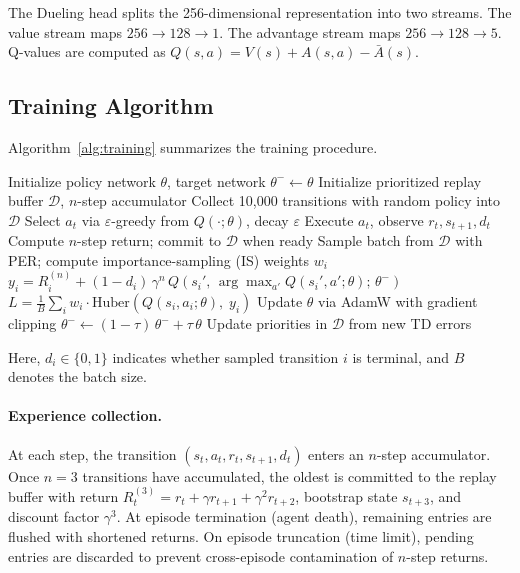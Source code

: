 \documentclass[12pt,a4paper,titlepage]{article}
\begin{document}
The Dueling head splits the 256-dimensional representation into two streams. The value stream maps $256 \to 128 \to 1$. The advantage stream maps $256 \to 128 \to 5$. Q-values are computed as $Q(s,a) = V(s) + A(s,a) - \bar{A}(s)$.

\subsection{Training Algorithm}
\label{sec:training_algorithm}

Algorithm~\ref{alg:training} summarizes the training procedure.

\begin{algorithm}[h]
\caption{Rainbow-lite DQN training.}
\label{alg:training}
\begin{algorithmic}[1]
\State Initialize policy network $\theta$, target network $\theta^- \leftarrow \theta$
\State Initialize prioritized replay buffer $\mathcal{D}$, $n$-step accumulator
\State Collect 10{,}000 transitions with random policy into $\mathcal{D}$
    \State Select $a_t$ via $\varepsilon$-greedy from $Q(\cdot; \theta)$, decay $\varepsilon$
    \State Execute $a_t$, observe $r_t, s_{t+1}, d_t$
    \State Compute $n$-step return; commit to $\mathcal{D}$ when ready
    \State Sample batch from $\mathcal{D}$ with PER; compute importance-sampling (IS) weights $w_i$
    \State $y_i = R_i^{(n)} + (1 - d_i)\,\gamma^n\, Q\!\left(s_i',\, \arg\max_{a'} Q(s_i', a'; \theta);\, \theta^-\right)$
    \State $L = \frac{1}{B}\sum_i w_i \cdot \text{Huber}(Q(s_i, a_i; \theta),\; y_i)$
    \State Update $\theta$ via AdamW with gradient clipping
    \State $\theta^- \leftarrow (1-\tau)\,\theta^- + \tau\,\theta$
    \State Update priorities in $\mathcal{D}$ from new TD errors
\EndFor
\end{algorithmic}
\end{algorithm}
Here, $d_i \in \{0,1\}$ indicates whether sampled transition $i$ is terminal, and $B$ denotes the batch size.
\paragraph{Experience collection.} At each step, the transition $(s_t, a_t, r_t, s_{t+1}, d_t)$ enters an $n$-step accumulator. Once $n = 3$ transitions have accumulated, the oldest is committed to the replay buffer with return $R_t^{(3)} = r_t + \gamma r_{t+1} + \gamma^2 r_{t+2}$, bootstrap state $s_{t+3}$, and discount factor $\gamma^3$. At episode termination (agent death), remaining entries are flushed with shortened returns. On episode truncation (time limit), pending entries are discarded to prevent cross-episode contamination of $n$-step returns.
\end{document}
